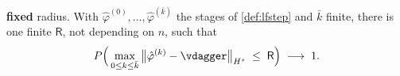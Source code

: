 \begin{assumption}
\begin{enumerate}
\textbf{fixed} radius. With $\hat\varphi^{(0)},\dots,\hat\varphi^{(\bar k)}$ the stages of
\cref{def:lfstep} and $\bar k$ finite, there is one finite $\mathsf R$, not depending on $n$, such that
\[
P\Big(\max_{0\le k\le\bar k}\big\|\hat\varphi^{(k)}-\vdagger\big\|_{H^{s}}\;\le\;\mathsf R\Big)
\;\longrightarrow\;1 .
\]
\end{enumerate}
\end{assumption}



